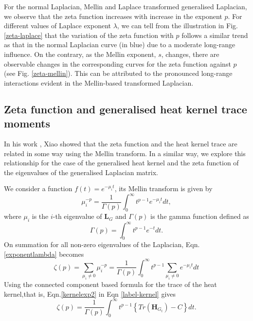 \documentclass[10pt,a4paper]{article}
\theoremstyle{plain}
\theoremstyle{definition}
\begin{document}
    For the normal Laplacian, Mellin and Laplace transformed generalised Laplacian, we observe that the zeta function increases with increase in the exponent $p$. For different values of Laplace exponent $\lambda$, we can tell from the illustration in Fig.\ref{zeta-laplace} that the variation of the zeta function with $p$ follows a similar trend as that in the normal Laplacian curve (in blue) due to a moderate long-range influence. On the contrary, as the Mellin exponent, $s$, changes, there are observable changes in the corresponding curves for the zeta function against $p$ (see Fig. \ref{zeta-mellin}). This can be attributed to the pronounced long-range interactions evident in the Mellin-based transformed Laplacian.
    
    \subsection{Zeta function and generalised heat kernel trace moments}
     In his work \citep{xiao2009graph}, Xiao showed that the zeta function and the heat kernel trace are related in some way using the Mellin transform. In a similar way, we explore this relationship for the case of the generalised heat kernel and the zeta function of the eigenvalues of the generalised Laplacian matrix.
    
    We consider a function $f(t)=e^{-\mu_i t}$, its Mellin transform is given by
    \begin{equation}
    \mu_i ^{-p} = \frac{1}{\Gamma(p)} \int_{0}^{\infty} t^{p-1} e^{-\mu_i t} dt,
    \label{exponentlambda}
    \end{equation}
    where $\mu_i$ is the $i$-th eigenvalue of $\mathbf{L}_G$ and $\Gamma(p)$ is the gamma function defined as 
    \begin{equation}
    \Gamma(p) = \int_{0}^{\infty} t^{p-1} e^{-t} dt.
    \end{equation}
    On summation for all non-zero eigenvalues of the Laplacian, Eqn.\ref{exponentlambda} becomes
    \begin{equation}
    \zeta(p) = \sum_{\mu_i \neq 0} \mu_i ^{-p} = \frac{1}{\Gamma(p)} \int_{0}^{\infty} t^{p-1} \sum_{\mu_i \neq 0} e^{-\mu_i t} dt
    \label{label-kernel}
    \end{equation}
    Using the connected component based formula for the trace of the heat kernel,that is, Eqn.\ref{kernelexp2} in Eqn \ref{label-kernel} gives
    \begin{equation}
    \zeta(p) = \frac{1}{\Gamma(p)} \int_{0}^{\infty} t^{p-1} \left \{ Tr(\mathbf{H}_{G_t})-C \right \} dt.
    \end{equation}
    
\end{document}
